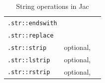 {\begin{table}[t]
\begin{tabular}{l p{3cm} p{6cm}}
            \lstinline{.str::endswith}                            &                                                                                                                                                                &                      \\
            \lstinline{.str::replace}                             &                                                                                                                                                                &                      \\
            \lstinline{.str::strip}                               & optional,                                                                                                                                                      &                      \\
            \lstinline{.str::lstrip}                              & optional,                                                                                                                                                      &                      \\
            \lstinline{.str::rstrip}                              & optional,                                                                                                                                                      &                      \\
            \bottomrule
        \end{tabular}
        \caption{String operations in Jac}
        \label{tab:strops} %
    \end{table}
}

